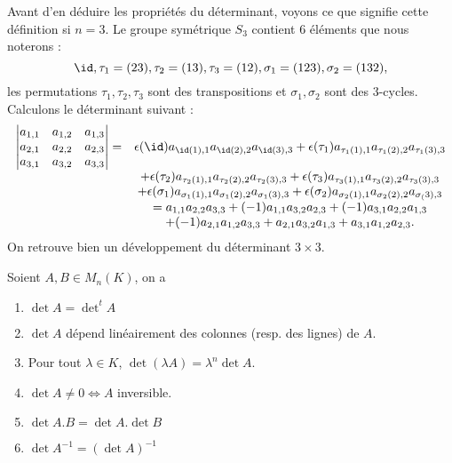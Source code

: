 \documentclass[class=report,crop=false]{standalone}
\begin{document}
Avant d'en déduire les propriétés du déterminant, voyons ce que signifie cette définition 
si $n=3$. Le groupe symétrique $S_3$ contient $6$ éléments que nous noterons :
$$\id, \tau_1=(23), \tau_2=(13), \tau_3=(12), \sigma_1=(123), \sigma_2=(132),$$
les permutations $\tau_1,\tau_2,\tau_3$ sont des transpositions et $\sigma_1,\sigma_2$ 
sont des $3$-cycles. Calculons le déterminant suivant :
$$\begin{array}{cc}\left|\begin{matrix}a_{1,1} & a_{1,2} & a_{1,3}\cr
a_{2,1} & a_{2,2} & a_{2,3}\cr a_{3,1} & a_{3,2} & a_{3,3}\end{matrix}\right|=
&\epsilon(\id) a_{\id(1),1}a_{\id(2),2}a_{\id(3),3}
+\epsilon(\tau_1)a_{\tau_1(1),1}a_{\tau_1(2),2}a_{\tau_1(3),3}\cr
&+\epsilon(\tau_2)a_{\tau_2(1),1}a_{\tau_2(2),2}a_{\tau_2(3),3}
+\epsilon(\tau_3)a_{\tau_3(1),1}a_{\tau_3(2),2}a_{\tau_3(3),3}\cr
&+\epsilon(\sigma_1)a_{\sigma_1(1),1}a_{\sigma_1(2),2}a_{\sigma_1(3),3}
+\epsilon(\sigma_2)a_{\sigma_2(1),1}a_{\sigma_2(2),2}a_{\sigma_(3),3}\cr
&=a_{1,1}a_{2,2}a_{3,3}
+(-1)a_{1,1}a_{3,2}a_{2,3}
+(-1)a_{3,1}a_{2,2}a_{1,3}\cr
&+(-1)a_{2,1}a_{1,2}a_{3,3}
 +a_{2,1}a_{3,2}a_{1,3}+a_{3,1}a_{1,2}a_{2,3}.\end{array}$$
On retrouve bien un développement du déterminant $3\times 3$.


\begin{proposition}
Soient $A, B\in M_n(K)$, on a
\begin{enumerate}
  \item $\det A=\det^t\!\!A$
  \item $\det A$ dépend linéairement des colonnes (resp. des lignes) de $A$.
  \item Pour tout $\lambda\in K$, $\det (\lambda A)=\lambda^n\det A$.
  \item $\det A\neq 0\iff A$ inversible.
  \item $\det A.B=\det A.\det B$
  \item $\det A^{-1}=(\det A)^{-1}$  
\end{enumerate}  
\end{proposition}
\end{document}
